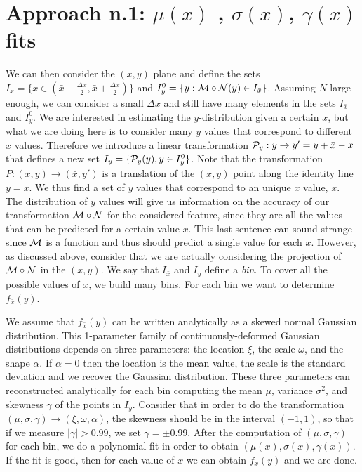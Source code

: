 \documentclass[prd,aps,twocolumn,a4paper,showkeys,nofootinbib]{revtex4-1}
\def\N{{\cal N}}
\def\M{{\cal M}}
\def\P{{\cal P}}
\def\Ix{{I_{\bar{x}}}}
\def\Iy{{I_y}}
\begin{document}
\section{Approach n.1: $\mu(x)$ , $\sigma(x)$, $\gamma(x)$ fits}
We can then consider the $(x,y)$ plane and define the sets
$\Ix = \{ x \in (\bar{x}-\frac{\Delta x}{2}, \bar{x}+\frac{\Delta x}{2}) \}$ and
$I_y^0 = \{y: \M\circ \N(y)\in I_{\bar{x}} \}$. Assuming $N$ large enough, we can consider a small $\Delta x$ 
and still have many elements in the sets $\Ix$ and $I_y^0$. We are interested in estimating the $y$-distribution
given a certain $x$, but what we are doing here is to consider many $y$ values that correspond to different
$x$ values. Therefore we introduce a linear transformation $\P_y: y \rightarrow y'=y+\bar{x}-x$ 
that defines a new set $\Iy = \{ \P_y(y), y\in I_y^0 \}$. Note that the transformation 
$P: (x,y)\rightarrow (\bar{x}, y')$ is a translation of the $(x,y)$ point along the identity line $y=x$.
We thus find a set of $y$ values that correspond to an unique $x$ value, $\bar{x}$.
The distribution of $y$ values will give us information on the accuracy of our transformation 
$\M\circ\N$ for the considered feature, since they are all the values that can be predicted for a certain value $x$. 
This last sentence can sound strange since $\M$ is a function and thus should predict a single value for each $x$. 
However, as discussed above, consider that we are actually considering the projection of $\M\circ\N$ in the $(x,y)$.
We say that $\Ix$ and $\Iy$ define a {\it bin}. To cover all the possible values of $x$, we build many bins.
For each bin we want to determine $f_{\bar{x}}(y)$. 

We assume that $f_{\bar{x}}(y)$ can be written analytically as a skewed normal Gaussian distribution.
This 1-parameter family of continuously-deformed Gaussian distributions depends on three parameters: the location $\xi$, 
the scale $\omega$, and the shape $\alpha$. If $\alpha=0$ then the location is the mean value, the scale 
is the standard deviation and we recover the Gaussian distribution.
These three parameters can reconstructed analytically for each bin computing the mean $\mu$, variance $\sigma^2$, and 
skewness $\gamma$ of the points in $\Iy$. 
Consider that in order to do the transformation $(\mu,\sigma,\gamma)\rightarrow(\xi,\omega,\alpha)$, the
skewness should be in the interval $(-1,1)$, so that if we measure $|\gamma|>0.99$, we set $\gamma=\pm 0.99$.
After the computation of $(\mu,\sigma,\gamma)$ for each bin, we do a polynomial fit in order to obtain 
$(\mu(x),\sigma(x),\gamma(x))$. If the fit is good, then for each value of $x$ we can obtain $f_{\bar{x}}(y)$
and we are done. 
\end{document}
